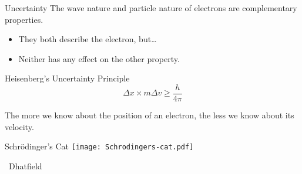\documentclass[notes=hide]{beamer}
\begin{document}
\begin{frame}{Uncertainty}
	The wave nature and particle nature of electrons are
	\alert{complementary properties}.
	\begin{itemize}
		\item They both describe the electron, but\ldots
		\item Neither has any effect on the other property.
	\end{itemize}

	\begin{block}{Heisenberg's Uncertainty Principle}
		\begin{equation*}
			\Delta x \times m \Delta v \geq \frac{h}{4\pi}
		\end{equation*}

		The more we know about the position of an electron, the less we
		know about its velocity.
	\end{block}
\end{frame}

\begin{frame}{Schrödinger's Cat}
	\centering
	\texttt{[image: Schrodingers-cat.pdf]}

	\footnotesize \ccbysa\ Dhatfield
\end{frame}


\end{document}
